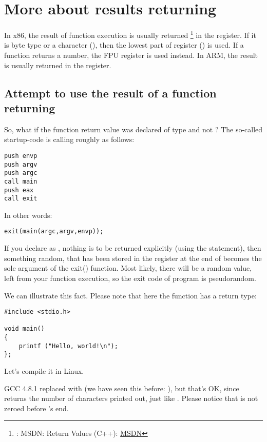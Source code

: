 \section{More about results returning}


In x86, the result of function execution is usually returned
\footnote{\Seealso: MSDN: Return Values (C++): \href{http://go.yurichev.com/17258}{MSDN}}
in the \EAX register. 
If it is byte type or a character (\Tchar), then the lowest part of register \EAX (\AL) is used. 
If a function returns a \Tfloat number, the FPU register  is used instead.
In ARM, the result is usually returned in the  register.

\subsection{Attempt to use the result of a function returning \Tvoid}

So, what if the \main function return value was declared of type \Tvoid and not \Tint?
The so-called startup-code is calling \main roughly as follows:

\begin{lstlisting}
push envp
push argv
push argc
call main
push eax
call exit
\end{lstlisting}

In other words:

\begin{lstlisting}
exit(main(argc,argv,envp));
\end{lstlisting}

If you declare \main as \Tvoid, nothing is to be returned explicitly (using the  statement),
then something random, that has been stored in the \EAX register at the end of \main becomes 
the sole argument of the exit() function.
Most likely, there will be a random value, left from your function execution, so the exit code of program is pseudorandom.
\par
We can illustrate this fact. 
Please note that here the \main function has a \Tvoid return type:

\begin{lstlisting}
#include <stdio.h>

void main()
{
	printf ("Hello, world!\n");
};
\end{lstlisting}

Let's compile it in Linux.

GCC 4.8.1 replaced \printf with \puts 
(we have seen this before: ), but that's OK,
since \puts returns the number of characters printed out, just like \printf.
Please notice that \EAX is not zeroed before \main's end.

